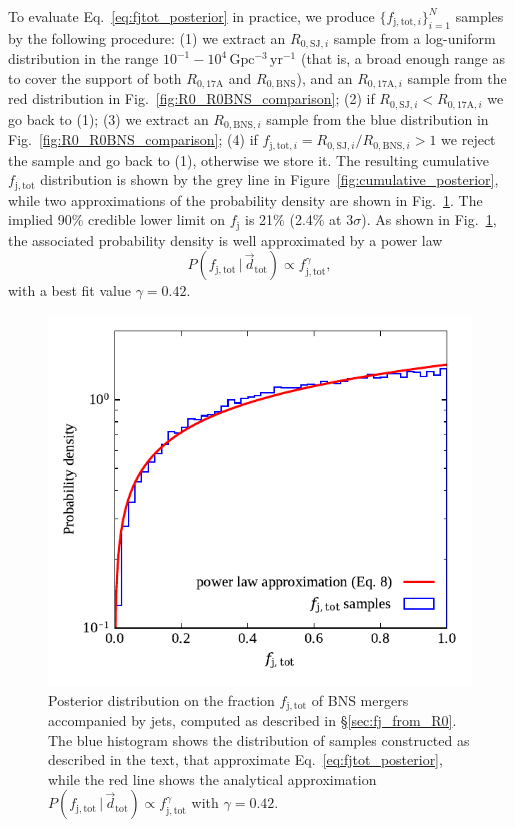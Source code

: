 \documentclass[]{aa}
\newcommand{\resp}[1]{#1}
\begin{document}
%
\resp{To evaluate Eq.~\ref{eq:fjtot_posterior}} in practice, we produce $\lbrace f_{\mathrm{j,tot},i} \rbrace_{i=1}^{N}$ samples by the following procedure: (1) we extract an $R_{\mathrm{0,SJ},i}$ sample from a log-uniform distribution in the range $10^{-1}-10^4\,\mathrm{Gpc^{-3}\,yr^{-1}}$ \resp{(that is, a broad enough range as to cover the support of both $R_\mathrm{0,17A}$ and $R_\mathrm{0,BNS}$)}, and an $R_{\mathrm{0,17A},i}$ sample from the red distribution in Fig.~\ref{fig:R0_R0BNS_comparison}; (2) if $R_{\mathrm{0,SJ},i}<R_{\mathrm{0,17A},i}$ we go back to (1); (3) we extract an $R_{\mathrm{0,BNS},i}$ sample from the blue distribution in Fig.~\ref{fig:R0_R0BNS_comparison}; (4) if $f_{\mathrm{j,tot},i}=R_{\mathrm{0,SJ},i}/R_{\mathrm{0,BNS},i}>1$ we reject the sample and go back to (1), otherwise we store it. The resulting cumulative $f_\mathrm{j,tot}$ distribution is shown by the grey line in Figure~\ref{fig:cumulative_posterior}, while two approximations of the probability density are shown in Fig.~\ref{fig:fj_posterior_R0_R0BNS_comparison}.  The implied 90\% credible lower limit on $f_\mathrm{j}$ is 21\% (2.4\% at $3\sigma$). As shown in Fig.~\ref{fig:fj_posterior_R0_R0BNS_comparison}, the associated probability density is well approximated by a power law 
\begin{equation}
 P(f_\mathrm{j,tot}\,|\,\vec d_\mathrm{tot})\propto f_\mathrm{j,tot}^{\gamma},
 \label{eq:P(fj from R0)}
\end{equation}
with a best fit value $\gamma=0.42$.
%
\begin{figure} 
 \centering
 \includegraphics[width=\columnwidth]{figures/fj_R0comparison_posterior.pdf}
 \caption{Posterior distribution on the fraction $f_\mathrm{j,tot}$ of BNS mergers accompanied by jets, computed \resp{as described in \S\ref{sec:fj_from_R0}}. The blue histogram shows the distribution of samples constructed as described in \resp{the text, that approximate Eq.~\ref{eq:fjtot_posterior}}, while the red line shows the analytical approximation $P(f_\mathrm{j,tot}\,|\,\vec d_\mathrm{tot})\propto f_\mathrm{j,tot}^\gamma$ with $\gamma=0.42$.}
 \label{fig:fj_posterior_R0_R0BNS_comparison} 
\end{figure}
%
  
\end{document}
